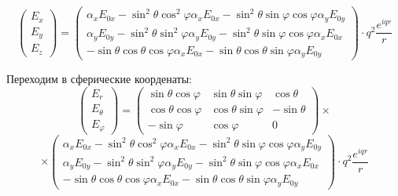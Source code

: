 \documentclass[12pt]{article}
\begin{document}
\begin{large}
\begin{eqnarray*}
\end{eqnarray*}
\begin{equation*}
    \begin{pmatrix}
        E_x \\
        E_y \\
        E_z
    \end{pmatrix}
    =
    \begin{pmatrix}
        \alpha_x E_{0x} - \sin^2 \theta \cos^2 \varphi \alpha_x E_{0x} - \sin^2 \theta \sin \varphi \cos \varphi \alpha_y E_{0y} \\
        \alpha_y E_{0y} - \sin^2 \theta \sin^2 \varphi \alpha_y E_{0y} - \sin^2 \theta \sin \varphi \cos \varphi \alpha_x E_{0x} \\
        - \sin \theta \cos \theta \cos \varphi \alpha_x E_{0x} - \sin \theta \cos \theta \sin \varphi \alpha_y E_{0y}
    \end{pmatrix}
    \cdot q^2 \frac{e^{iqr}}{r}
\end{equation*}
\par Переходим в сферические коорденаты:
\begin{equation*}
    \begin{pmatrix}
        E_r \\
        E_\theta \\
        E_\varphi
    \end{pmatrix}
    =
    \begin{pmatrix}
        \sin \theta \cos \varphi & \sin \theta \sin \varphi & \cos \theta\\
        \cos \theta \cos \varphi & \cos \theta \sin \varphi & -\sin \theta\\
        -\sin \varphi & \cos \varphi & 0
    \end{pmatrix} \times
\end{equation*}
\begin{equation*}
    \times
    \begin{pmatrix}
        \alpha_x E_{0x} - \sin^2 \theta \cos^2 \varphi \alpha_x E_{0x} - \sin^2 \theta \sin \varphi \cos \varphi \alpha_y E_{0y} \\
        \alpha_y E_{0y} - \sin^2 \theta \sin^2 \varphi \alpha_y E_{0y} - \sin^2 \theta \sin \varphi \cos \varphi \alpha_x E_{0x} \\
        - \sin \theta \cos \theta \cos \varphi \alpha_x E_{0x} - \sin \theta \cos \theta \sin \varphi \alpha_y E_{0y}
    \end{pmatrix}
    \cdot q^2 \frac{e^{iqr}}{r}
\end{equation*}

\end{large}
\end{document}
